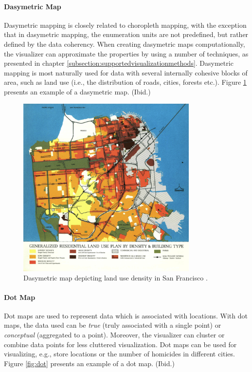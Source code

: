 \paragraph{Dasymetric Map}

Dasymetric mapping is closely related to choropleth mapping, with the exception that in dasymetric mapping, the enumeration units are not predefined, but rather defined by the data coherency. When creating dasymetric maps computationally, the visualizer can approximate the properties by using a number of techniques, as presented in chapter \ref{subsection:supportedvisualizationmethods}. Dasymetric mapping is most naturally used for data with several internally cohesive blocks of area, such as land use (i.e., the distribution of roads, cities, forests etc.). Figure \ref{fig:dasymetric} presents an example of a dasymetric map. (Ibid.)

\begin{figure}[htbp]
  \begin{center}
    \includegraphics[width=9cm]{images/dasymetric-example.jpg}
    \caption{Dasymetric map depicting land use density in San Francisco \citep{fischer_generalized_2012}.}
    \label{fig:dasymetric}
  \end{center}
\end{figure}

\paragraph{Dot Map}

Dot maps are used to represent data which is associated with locations. With dot maps, the data used can be \emph{true} (truly associated with a single point) or \emph{conceptual} (aggregated to a point). Moreover, the visualizer can cluster or combine data points for less cluttered visualization. Dot maps can be used for visualizing, e.g., store locations or the number of homicides in different cities. Figure \ref{fig:dot} presents an example of a dot map. (Ibid.)

